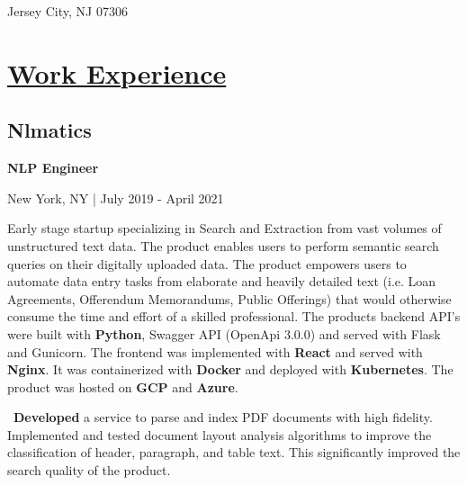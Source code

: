 \documentclass{article}
\begin{document}
\begin{minipage}[t][0pt]{8in\linewidth}
\begin{minipage}[t]{17em\linewidth\hspace{-4em}}
        \hspace{1.25em}\small\mdseries\textrm{Jersey City, NJ 07306}
    \end{minipage}

\vspace{0.5em}

\begin{minipage}[t]{0.45\textwidth\hspace{0in}}

    \section{\underline{Work Experience}}
        \vspace{-0.8em}
        \subsection{Nlmatics}
        \vspace{-0.5em}\hspace{0.1em}
        \mdseries\bfseries{NLP Engineer}
        \vspace{0.1em}
        
        \hspace{0.5em}\mdseries\textrm{New York, NY | July 2019 - April 2021}

        \vspace{-0.8em}
        \begin{minipage}[t]{3.75in\textwidth\hspace{0in}}
            
            \vspace{0.3em}
            {Early stage startup specializing in Search and Extraction from vast volumes of unstructured text data. The product enables users to perform semantic search queries on their digitally uploaded data. The product empowers users to automate data entry tasks from elaborate and heavily detailed text (i.e. Loan Agreements, Offerendum Memorandums, Public Offerings) that would otherwise consume the time and effort of a skilled professional. The products backend API's were built with \textbf{Python}, Swagger API (OpenApi 3.0.0) and served with Flask and Gunicorn. The frontend was implemented with \textbf{React} and served with \textbf{Nginx}. It was containerized with \textbf{Docker} and deployed with \textbf{Kubernetes}. The product was hosted on \textbf{GCP} and \textbf{Azure}.}

            \vspace{0.3em}
            \hspace{1em}\textasteriskcentered \, \mdseries\textrm{\textbf{Developed} a service to parse and index PDF documents with high fidelity. Implemented and tested document layout analysis algorithms to improve the classification of header, paragraph, and table text. This significantly improved the search quality of the product.}
            

\end{minipage}
\end{minipage}
\end{minipage}
\end{document}

